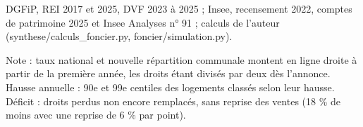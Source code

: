 DGFiP, REI 2017 et 2025, DVF 2023 à 2025 ; Insee, recensement 2022, comptes de patrimoine 2025 et Insee Analyses n° 91 ; calculs de l'auteur (synthese/calculs\_foncier.py, foncier/simulation.py).\par Note : taux national et nouvelle répartition communale montent en ligne droite à partir de la première année, les droits étant divisés par deux dès l'annonce. Hausse annuelle : 90e et 99e centiles des logements classés selon leur hausse. Déficit : droits perdus non encore remplacés, sans reprise des ventes (18 \% de moins avec une reprise de 6 \% par point).
